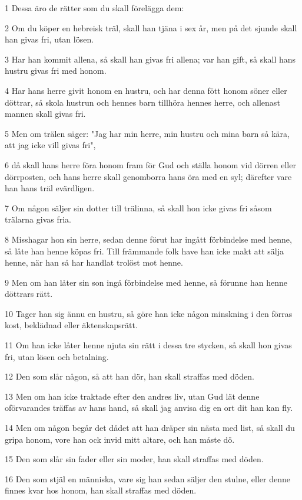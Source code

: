 \par 1 Dessa äro de rätter som du skall förelägga dem:
\par 2 Om du köper en hebreisk träl, skall han tjäna i sex år, men på det sjunde skall han givas fri, utan lösen.
\par 3 Har han kommit allena, så skall han givas fri allena; var han gift, så skall hans hustru givas fri med honom.
\par 4 Har hans herre givit honom en hustru, och har denna fött honom söner eller döttrar, så skola hustrun och hennes barn tillhöra hennes herre, och allenast mannen skall givas fri.
\par 5 Men om trälen säger: "Jag har min herre, min hustru och mina barn så kära, att jag icke vill givas fri",
\par 6 då skall hans herre föra honom fram för Gud och ställa honom vid dörren eller dörrposten, och hans herre skall genomborra hans öra med en syl; därefter vare han hans träl evärdligen.
\par 7 Om någon säljer sin dotter till trälinna, så skall hon icke givas fri såsom trälarna givas fria.
\par 8 Misshagar hon sin herre, sedan denne förut har ingått förbindelse med henne, så låte han henne köpas fri. Till främmande folk have han icke makt att sälja henne, när han så har handlat trolöst mot henne.
\par 9 Men om han låter sin son ingå förbindelse med henne, så förunne han henne döttrars rätt.
\par 10 Tager han sig ännu en hustru, så göre han icke någon minskning i den förras kost, beklädnad eller äktenskapsrätt.
\par 11 Om han icke låter henne njuta sin rätt i dessa tre stycken, så skall hon givas fri, utan lösen och betalning.
\par 12 Den som slår någon, så att han dör, han skall straffas med döden.
\par 13 Men om han icke traktade efter den andres liv, utan Gud lät denne oförvarandes träffas av hans hand, så skall jag anvisa dig en ort dit han kan fly.
\par 14 Men om någon begår det dådet att han dräper sin nästa med list, så skall du gripa honom, vore han ock invid mitt altare, och han måste dö.
\par 15 Den som slår sin fader eller sin moder, han skall straffas med döden.
\par 16 Den som stjäl en människa, vare sig han sedan säljer den stulne, eller denne finnes kvar hos honom, han skall straffas med döden.
